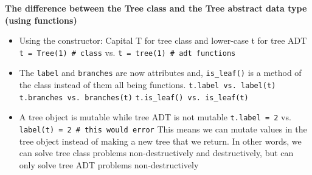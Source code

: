 \vspace{2mm}
\textbf{The difference between the Tree class and the Tree abstract data type (using functions)}
\begin{itemize}
\item Using the constructor: Capital T for tree class and lower-case t for tree ADT
    \subitem \lstinline{t = Tree(1) # class} vs. \lstinline{t = tree(1) # adt functions}
\item The \lstinline{label} and \lstinline{branches} are now attributes and, \lstinline{is_leaf()} is a method of the class instead of them all being functions.
    \subitem \lstinline{t.label vs. label(t)}
    \subitem \lstinline{t.branches vs. branches(t)}
    \subitem \lstinline{t.is_leaf() vs. is_leaf(t)}
\item A tree object is mutable while tree ADT is not mutable
    \subitem \lstinline{t.label = 2} vs. \lstinline{label(t) = 2 # this would error}
    \subitem This means we can mutate values in the tree object instead of making a new tree that we return. In other words, we can solve tree class problems non-destructively and destructively, but can only solve tree ADT problems non-destructively
\end{itemize}
